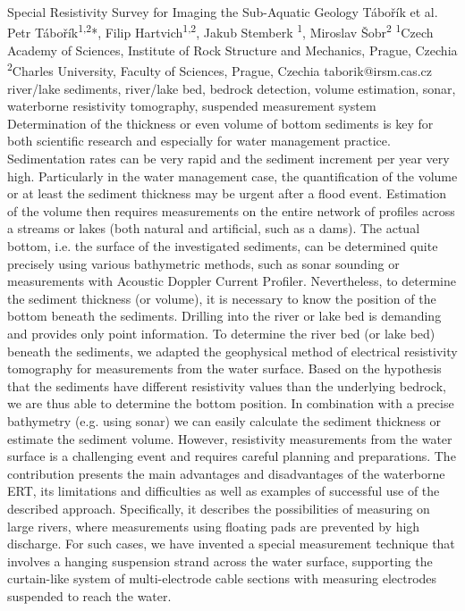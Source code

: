 \abstract
{Special Resistivity Survey for Imaging the Sub-Aquatic Geology} 
{Tábořík et al.} 
{Petr Tábořík\textsuperscript{1,2}*, Filip Hartvich\textsuperscript{1,2}, Jakub Stemberk	\textsuperscript{1}, Miroslav Šobr\textsuperscript{2}} 
{\TLtag} 
{
	\textsuperscript{1}Czech Academy of Sciences, Institute of Rock Structure and Mechanics, Prague, Czechia
	\textsuperscript{2}Charles University, Faculty of Sciences, Prague, Czechia
}
{taborik@irsm.cas.cz}  %
{river/lake sediments, river/lake bed, bedrock detection, volume estimation, sonar, waterborne resistivity tomography, suspended measurement system}
{
Determination of the thickness or even volume of bottom sediments is key for both scientific research and especially for water management practice. Sedimentation rates can be very rapid and the sediment increment per year very high. Particularly in the water management case, the quantification of the volume or at least the sediment thickness may be urgent after a flood event. Estimation of the volume then requires measurements on the entire network of profiles across a streams or lakes (both natural and artificial, such as a dams). The actual bottom, i.e. the surface of the investigated sediments, can be determined quite precisely using various bathymetric methods, such as sonar sounding or measurements with Acoustic Doppler Current Profiler. Nevertheless, to determine the sediment thickness (or volume), it is necessary to know the position of the bottom beneath the sediments. Drilling into the river or lake bed is demanding and provides only point information. To determine the river bed (or lake bed) beneath the sediments, we adapted the geophysical method of electrical resistivity tomography for measurements from the water surface. Based on the hypothesis that the sediments have different resistivity values than the underlying bedrock, we are thus able to determine the bottom position. In combination with a precise bathymetry (e.g. using sonar) we can easily calculate the sediment thickness or estimate the sediment volume. However, resistivity measurements from the water surface is a challenging event and requires careful planning and preparations. The contribution presents the main advantages and disadvantages of the waterborne ERT, its limitations and difficulties as well as examples of successful use of the described approach. Specifically, it describes the possibilities of measuring on large rivers, where measurements using floating pads are prevented by high discharge. For such cases, we have invented a special measurement technique that involves a hanging suspension strand across the water surface, supporting the curtain-like system of multi-electrode cable sections with measuring electrodes suspended to reach the water.
}
{
}

